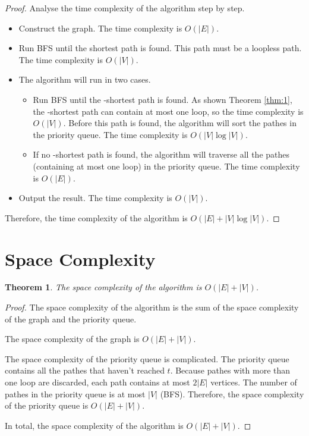 \documentclass[a4paper,oneside]{book}
\newtheorem{theorem}{Theorem}[section]
\begin{document}
\begin{proof}
    Analyse the time complexity of the algorithm step by step.

    \begin{itemize}[leftmargin=4em]
        \item[Step I] Construct the graph. The time complexity is $O(|E|)$.
        \item[Step II] Run BFS until the shortest path is found. This path must be a loopless path. The time complexity is $O(|V|)$.
        \item[Step III] The algorithm will run in two cases.
        \begin{itemize}[leftmargin=4em]
            \item[Case 1] Run BFS until the -shortest path is found. As shown Theorem \ref{thm:1}, the -shortest path can contain at most one loop, so the time complexity is $O(|V|)$. Before this path is found, the algorithm will sort the pathes in the priority queue. The time complexity is $O(|V| \log |V|)$.
            \item[Case 2] If no -shortest path is found, the algorithm will traverse all the pathes (containing at most one loop) in the priority queue. The time complexity is $O(|E|)$.
        \end{itemize}
        \item[Step IV] Output the result. The time complexity is $O(|V|)$.
    \end{itemize}
    Therefore, the time complexity of the algorithm is $O(|E| + |V| \log |V|)$.
\end{proof}

\section{Space Complexity}

\begin{theorem}
The space complexity of the algorithm is $O(|E| + |V|)$.
\end{theorem}

\begin{proof}
    The space complexity of the algorithm is the sum of the space complexity of the graph and the priority queue.

    The space complexity of the graph is $O(|E| + |V|)$.

    The space complexity of the priority queue is complicated. The priority queue contains all the pathes that haven't reached $t$. Because pathes with more than one loop are discarded, each path contains at most $2|E|$ vertices. The number of pathes in the priority queue is at most $|V|$ (BFS). Therefore, the space complexity of the priority queue is $O(|E| + |V|)$.

    In total, the space complexity of the algorithm is $O(|E| + |V|)$.
\end{proof}
\end{document}
